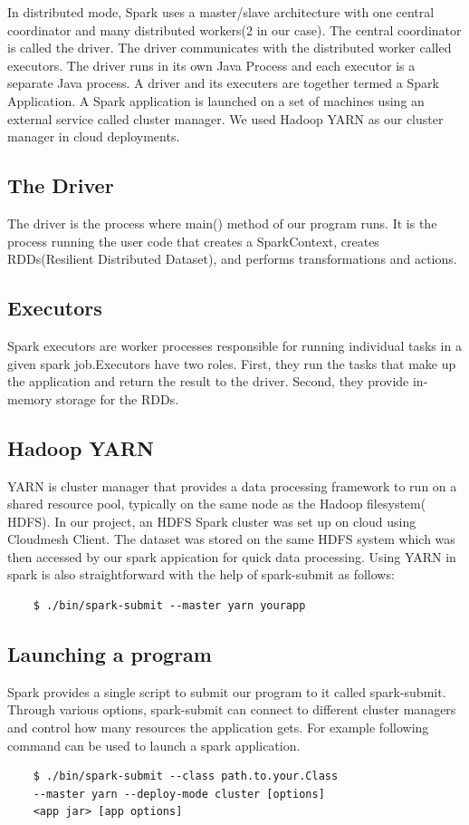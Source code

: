 \documentclass[9pt,twocolumn,twoside]{../../styles/osajnl}
\begin{document}
			

	
	In distributed mode, Spark uses a master/slave architecture with one central coordinator and many distributed workers(2 in our case). The central coordinator is called the driver. The driver communicates with the distributed worker called executors. The driver runs in its own Java Process and each executor is a separate Java process. A driver and its executers are together termed a Spark Application. A Spark application is launched on a set of machines using an external service called cluster manager. We used Hadoop YARN\cite{YARN} as our cluster manager in cloud deployments.
	
\subsection{The Driver}
	The driver is the process where main() method of our program runs. It is the process running the user code that creates a SparkContext, creates RDDs(Resilient Distributed Dataset), and performs transformations and actions.
	
\subsection{Executors}
	Spark executors are worker processes responsible for running individual tasks in a given spark job.Executors have two roles. First, they run the tasks that make up the application and return the result to the driver. Second, they provide in-memory storage for the RDDs.
	
\subsection{Hadoop YARN}
	YARN is cluster manager that provides a data processing framework to run on a shared resource pool, typically on the same node as the Hadoop filesystem( HDFS)\cite{HDFS}. In our project, an HDFS Spark cluster was set up on cloud using Cloudmesh Client.\cite{Cloudmesh} The dataset was stored on the same HDFS system which was then accessed by our spark appication for quick data processing. Using YARN in spark is also straightforward with the help of spark-submit as follows:
	
	\begin{verbatim}
	$ ./bin/spark-submit --master yarn yourapp
	\end{verbatim}	
	
\subsection{Launching a program}
	Spark provides a single script to submit our program to it called spark-submit. Through various options, spark-submit can connect to different cluster managers and control how many resources the application gets. For example following command can be used to launch a spark application.
	\begin{verbatim}
	$ ./bin/spark-submit --class path.to.your.Class 
	--master yarn --deploy-mode cluster [options] 
	<app jar> [app options]
	\end{verbatim}
	
\end{document}
